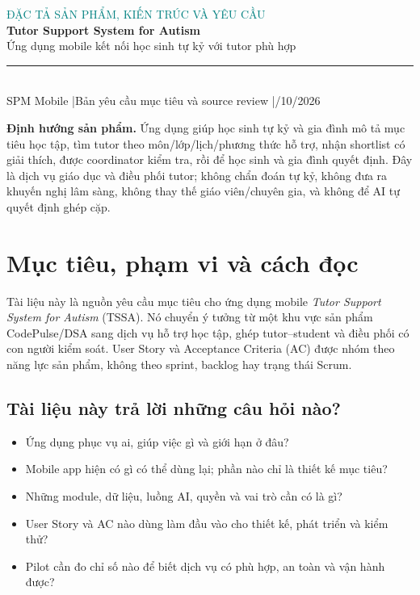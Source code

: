 \documentclass[11pt,a4paper]{article}
\begin{document}
\begin{center}
{\large\textcolor{teal}{ĐẶC TẢ SẢN PHẨM, KIẾN TRÚC VÀ YÊU CẦU}}\\[7pt]
{\LARGE\bfseries\color{ink}Tutor Support System for Autism}\\[5pt]
{\large Ứng dụng mobile kết nối học sinh tự kỷ với tutor phù hợp}\\[10pt]
\rule{0.84\textwidth}{0.7pt}\\[7pt]
\textcolor{muted}{SPM Mobile \quad|\quad Bản yêu cầu mục tiêu và source review \quad|/10/2026}
\end{center}

\vspace{4pt}
\colorbox{sky}{\parbox{\dimexpr\textwidth-2\fboxsep\relax}{
\textbf{Định hướng sản phẩm.} Ứng dụng giúp học sinh tự kỷ và gia đình mô tả mục tiêu học tập, tìm tutor theo môn/lớp/lịch/phương thức hỗ trợ, nhận shortlist có giải thích, được coordinator kiểm tra, rồi để học sinh và gia đình quyết định. Đây là dịch vụ giáo dục và điều phối tutor; không chẩn đoán tự kỷ, không đưa ra khuyến nghị lâm sàng, không thay thế giáo viên/chuyên gia, và không để AI tự quyết định ghép cặp.
}}

\newpage
\tableofcontents
\newpage

\section{Mục tiêu, phạm vi và cách đọc}

Tài liệu này là nguồn yêu cầu mục tiêu cho ứng dụng mobile \emph{Tutor Support System for Autism} (TSSA). Nó chuyển ý tưởng từ một khu vực sản phẩm CodePulse/DSA sang dịch vụ hỗ trợ học tập, ghép tutor--student và điều phối có con người kiểm soát. User Story và Acceptance Criteria (AC) được nhóm theo năng lực sản phẩm, không theo sprint, backlog hay trạng thái Scrum.

\subsection{Tài liệu này trả lời những câu hỏi nào?}
\begin{itemize}
  \item Ứng dụng phục vụ ai, giúp việc gì và giới hạn ở đâu?
  \item Mobile app hiện có gì có thể dùng lại; phần nào chỉ là thiết kế mục tiêu?
  \item Những module, dữ liệu, luồng AI, quyền và vai trò cần có là gì?
  \item User Story và AC nào dùng làm đầu vào cho thiết kế, phát triển và kiểm thử?
  \item Pilot cần đo chỉ số nào để biết dịch vụ có phù hợp, an toàn và vận hành được?
\end{itemize}
\end{document}
